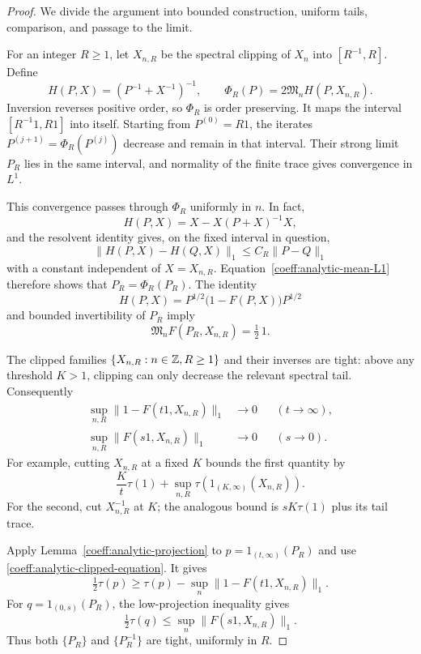 \begin{proof}
We divide the argument into bounded construction, uniform tails,
comparison, and passage to the limit.

For an integer \(R\ge1\), let \(X_{n,R}\) be the spectral clipping of
\(X_n\) into \([R^{-1},R]\).  Define
\[
 H(P,X)=(P^{-1}+X^{-1})^{-1},\qquad
 \Phi_R(P)=2\mathfrak M_nH(P,X_{n,R}).
\]
Inversion reverses positive order, so \(\Phi_R\) is order preserving.
It maps the interval \([R^{-1}1,R1]\) into itself.  Starting from
\(P^{(0)}=R1\), the iterates \(P^{(j+1)}=\Phi_R(P^{(j)})\) decrease and
remain in that interval.  Their strong limit \(P_R\) lies in the same
interval, and normality of the finite trace gives convergence in
\(L^1\).

This convergence passes through \(\Phi_R\) uniformly in \(n\).
In fact,
\[
 H(P,X)=X-X(P+X)^{-1}X,
\]
and the resolvent identity gives, on the fixed interval in question,
\[
 \|H(P,X)-H(Q,X)\|_1\le C_R\|P-Q\|_1
\]
with a constant independent of \(X=X_{n,R}\).
Equation~\eqref{coeff:analytic-mean-L1} therefore shows that
\(P_R=\Phi_R(P_R)\).  The identity
\begin{equation}\label{coeff:analytic-parallel-sum}
 H(P,X)=P^{1/2}\bigl(1-F(P,X)\bigr)P^{1/2}
\end{equation}
and bounded invertibility of \(P_R\) imply
\begin{equation}\label{coeff:analytic-clipped-equation}
 \mathfrak M_nF(P_R,X_{n,R})=\tfrac12\,1.
\end{equation}

The clipped families \(\{X_{n,R}:n\in\mathbb Z,R\ge1\}\) and their inverses
are tight: above any threshold \(K>1\), clipping can only decrease
the relevant spectral tail.  Consequently
\begin{align*}
 \sup_{n,R}\|1-F(t1,X_{n,R})\|_1&\longrightarrow0
                                      &&(t\longrightarrow\infty),\\
 \sup_{n,R}\|F(s1,X_{n,R})\|_1&\longrightarrow0
                                      &&(s\longrightarrow0).
\end{align*}
For example, cutting \(X_{n,R}\) at a fixed \(K\) bounds the first
quantity by
\[
 \frac{K}{t}\tau(1)
   +\sup_{n,R}\tau(1_{(K,\infty)}(X_{n,R})).
\]
For the second, cut \(X_{n,R}^{-1}\) at \(K\); the analogous bound is
\(sK\tau(1)\) plus its tail trace.

Apply Lemma~\ref{coeff:analytic-projection} to
\(p=1_{(t,\infty)}(P_R)\) and use
\eqref{coeff:analytic-clipped-equation}.  It gives
\[
 \tfrac12\tau(p)
 \ge \tau(p)-\sup_n\|1-F(t1,X_{n,R})\|_1.
\]
For \(q=1_{(0,s)}(P_R)\), the low-projection inequality gives
\[
 \tfrac12\tau(q)
 \le \sup_n\|F(s1,X_{n,R})\|_1.
\]
Thus both \(\{P_R\}\) and \(\{P_R^{-1}\}\) are tight, uniformly in \(R\).


\end{proof}
